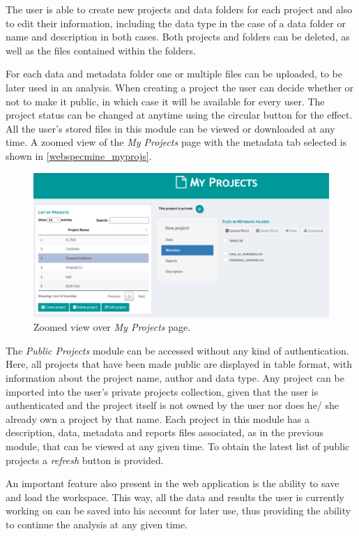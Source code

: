 The user is able to create new projects and data folders for each project and also to edit their information, including the data type in the case of a data folder or name and description in both cases. Both projects and folders can be deleted, as well as the files contained within the folders.

For each data and metadata folder one or multiple files can be uploaded, to be later used in an analysis. When creating a project the user can decide whether or not to make it public, in which case it will be available for every user. The project status can be changed at anytime using the circular button for the effect. All the user's stored files in this module can be viewed or downloaded at any time. A zoomed view of the \textit{My Projects} page with the metadata tab selected is shown in \autoref{webspecmine_myprojs}.

\begin{figure}[h]
	\centering
	\includegraphics[width=0.9\linewidth]{Imagens/webspecmine_myprojs}
	\caption{Zoomed view over \textit{My Projects} page.}
	\label{webspecmine_myprojs}
\end{figure}

The \textit{Public Projects} module can be accessed without any kind of authentication. Here, all projects that have been made public are displayed in table format, with information about the project name, author and data type. Any project can be imported into the user's private projects collection, given that the user is authenticated and the project itself is not owned by the user nor does he/ she already own a project by that name. Each project in this module has a description, data, metadata and reports files associated, as in the previous module, that can be viewed at any given time. To obtain the latest list of public projects a \textit{refresh} button is provided.

An important feature also present in the web application is the ability to save and load the workspace. This way, all the data and results the user is currently working on can be saved into his account for later use, thus providing the ability to continue the analysis at any given time.

